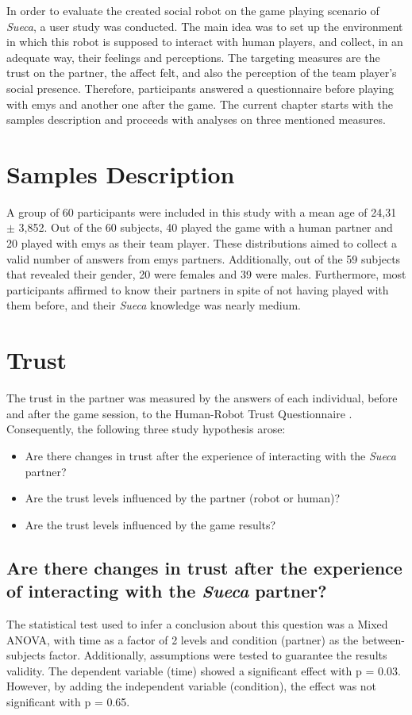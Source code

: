 \label{chapter:results}

In order to evaluate the created social robot on the game playing scenario of \emph{Sueca}, a user study was conducted.
The main idea was to set up the environment in which this robot is supposed to interact with human players, and collect, in an adequate way, their feelings and perceptions.
The targeting measures are the trust on the partner, the affect felt, and also the perception of the team player's social presence.
Therefore, participants answered a questionnaire before playing with \ac{emys} and another one after the game.
The current chapter starts with the samples description and proceeds with analyses on three mentioned measures.


\section{Samples Description}
\label{sec:samples}
A group of 60 participants were included in this study with a mean age of 24,31 $\pm$ 3,852.
Out of the 60 subjects, 40 played the game with a human partner and 20 played with \ac{emys} as their team player.
These distributions aimed to collect a valid number of answers from \ac{emys} partners.
Additionally, out of the 59 subjects that revealed their gender, 20 were females and 39 were males.
Furthermore, most participants affirmed to know their partners in spite of not having played with them before, and their \emph{Sueca} knowledge was nearly medium.

\section{Trust}
\label{sec:trust}
The trust in the partner was measured by the answers of each individual, before and after the game session, to the Human-Robot Trust Questionnaire \cite{Schaefer2013}.
Consequently, the following three study hypothesis arose:
\begin{itemize}
\item Are there changes in trust after the experience of interacting with the \emph{Sueca} partner?
\item Are the trust levels influenced by the partner (robot or human)?
\item Are the trust levels influenced by the game results?
\end{itemize}


\subsection*{Are there changes in trust after the experience of interacting with the \emph{Sueca} partner?}
The statistical test used to infer a conclusion about this question was a Mixed ANOVA, with time as a factor of 2 levels and condition (partner) as the between-subjects factor.
Additionally, assumptions were tested to guarantee the results validity.
The dependent variable (time) showed a significant effect with p = 0.03.
However, by adding the independent variable (condition), the effect was not significant with p = 0.65.

